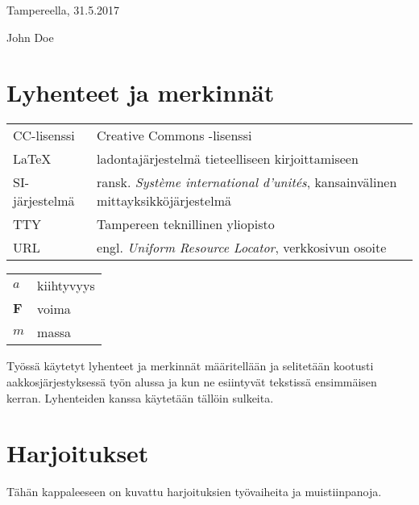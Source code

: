 \documentclass[globalnumbering,centeredcaptions,draftfooter]{tutthesis/tutthesis} %
\begin{document}
\vspace{2\baselineskip}

Tampereella, 31.5.2017

\vspace{2\baselineskip}

John Doe



\tableofcontents

\listoffigures



\chapter*{Lyhenteet ja merkinnät}


\begin{tabular}[h]{@{} p{} p{} @{}}
CC-lisenssi & Creative Commons -lisenssi \\
LaTeX & ladontajärjestelmä tieteelliseen kirjoittamiseen \\
SI-järjestelmä & ransk. \emph{Système international d'unités}, kansainvälinen mittayksikköjärjestelmä \\
TTY & Tampereen teknillinen yliopisto \\
URL & engl. \emph{Uniform Resource Locator}, verkkosivun osoite 
\end{tabular}

\begin{tabular}[h]{@{} p{} p{} @{}}
$a$ & kiihtyvyys \\
$\mathbf{F}$ & voima \\
$m$ & massa
\end{tabular}

Työssä käytetyt lyhenteet ja merkinnät määritellään ja selitetään kootusti aakkosjärjestyksessä työn alussa ja kun ne esiintyvät tekstissä ensimmäisen kerran. Lyhenteiden kanssa käytetään tällöin sulkeita.


\chapter{Harjoitukset}
\label{ch:harjoitukset}

Tähän kappaleeseen on kuvattu harjoituksien työvaiheita ja muistiinpanoja.
\end{document}
